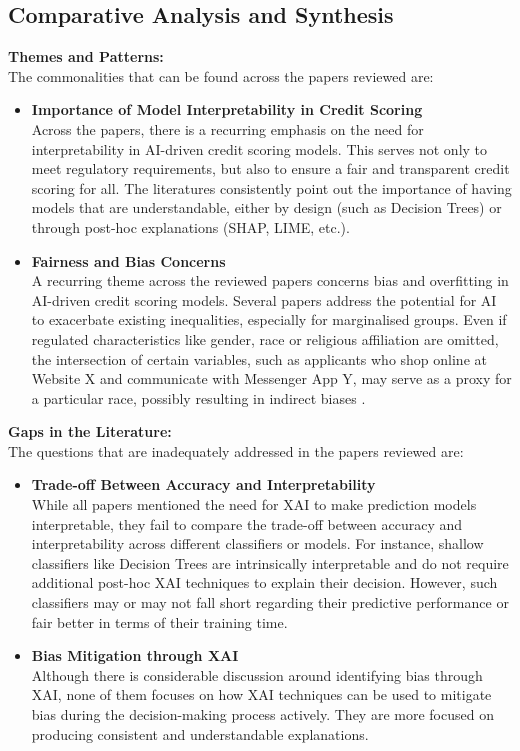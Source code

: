 \documentclass[12pt,a4paper]{article}
\begin{document}
\subsection{Comparative Analysis and Synthesis}
\vspace{-1em}
\textbf{Themes and Patterns:}\\
The commonalities that can be found across the papers reviewed are:
\begin{itemize}
    \vspace{-1em}
    \item \textbf{Importance of Model Interpretability in Credit Scoring}\\
    Across the papers, there is a recurring emphasis on the need for interpretability in AI-driven credit scoring models. This serves not only to meet regulatory requirements, but also to ensure a fair and transparent credit scoring for all. The literatures consistently point out the importance of having models that are understandable, either by design (such as Decision Trees) or through post-hoc explanations (SHAP, LIME, etc.).
    \item \textbf{Fairness and Bias Concerns}\\
    A recurring theme across the reviewed papers concerns bias and overfitting in AI-driven credit scoring models. Several papers address the potential for AI to exacerbate existing inequalities, especially for marginalised groups. Even if regulated characteristics like gender, race or religious affiliation are omitted, the intersection of certain variables, such as applicants who shop online at Website X and communicate with Messenger App Y, may serve as a proxy for a particular race, possibly resulting in indirect biases \citep{langenbucher2022responsible}.
\end{itemize}

\textbf{Gaps in the Literature:}\\
The questions that are inadequately addressed in the papers reviewed are:
\begin{itemize}
    \vspace{-1em}
    \item \textbf{Trade-off Between Accuracy and Interpretability}\\
    While all papers mentioned the need for XAI to make prediction models interpretable, they fail to compare the trade-off between accuracy and interpretability across different classifiers or models. For instance, shallow classifiers like Decision Trees are intrinsically interpretable and do not require additional post-hoc XAI techniques to explain their decision. However, such classifiers may or may not fall short regarding their predictive performance or fair better in terms of their training time.
    \item \textbf{Bias Mitigation through XAI}\\
    Although there is considerable discussion around identifying bias through XAI, none of them focuses on how XAI techniques can be used to mitigate bias during the decision-making process actively. They are more focused on producing consistent and understandable explanations.
\end{itemize}
\end{document}
